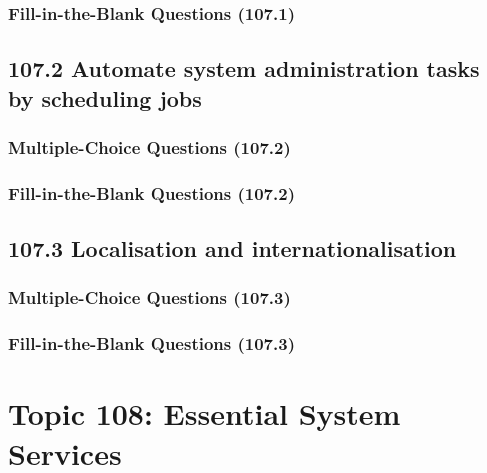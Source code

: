 \documentclass[a4paper]{report}
\begin{document}
\subsubsection*{Fill-in-the-Blank Questions (107.1)}

\subsection*{107.2 Automate system administration tasks by scheduling jobs}
\subsubsection*{Multiple-Choice Questions (107.2)}

\subsubsection*{Fill-in-the-Blank Questions (107.2)}

\subsection*{107.3 Localisation and internationalisation}
\subsubsection*{Multiple-Choice Questions (107.3)}

\subsubsection*{Fill-in-the-Blank Questions (107.3)}


\section*{Topic 108: Essential System Services}

\end{document}
